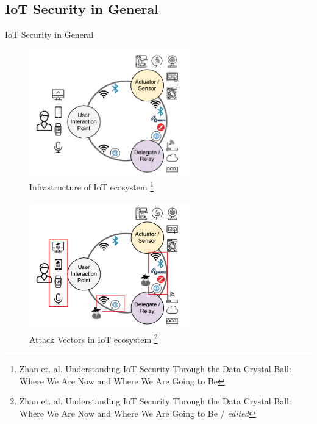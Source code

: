 \documentclass[11pt,t,usepdftitle=false,aspectratio=169]{beamer}
\begin{document}
\subsection{IoT Security in General} %
\label{sub:general_security}
\begin{frame}{IoT Security in General} %
	\only<1>
	{
		\begin{figure}
			\centering
			\includegraphics[height=5.5cm,keepaspectratio]{img/iot_ecosystem.png}
			\caption{\small{Infrastructure of IoT ecosystem} \footnote{\tiny{Zhan et. al. Understanding IoT Security Through the Data Crystal Ball: Where We Are Now and Where We Are Going to Be}}}
		\end{figure}
		
	}
	{
		\begin{figure}
			\centering
			\includegraphics[height=5.5cm, keepaspectratio]{img/iot-ecosystem_attack-vectors.png}
			\caption{\small{Attack Vectors in IoT ecosystem} \footnote{\tiny{Zhan et. al. Understanding IoT Security Through the Data Crystal Ball: Where We Are Now and Where We Are Going to Be / \textit{edited}}}}
		\end{figure}
	}
\end{frame}
\end{document}
